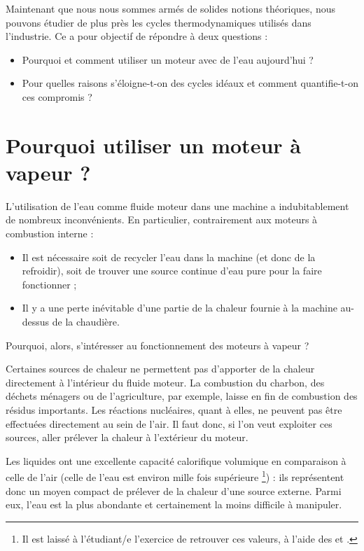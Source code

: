
	Maintenant que nous nous sommes armés de solides notions théoriques, nous pouvons étudier de plus près les cycles thermodynamiques utilisés dans l’industrie. Ce \coursneuf a pour objectif de répondre à deux questions :
	\begin{itemize}
		\item Pourquoi et comment utiliser un moteur avec de l’eau aujourd’hui ?
		\item Pour quelles raisons s’éloigne-t-on des cycles idéaux et comment quantifie-t-on ces compromis ?
	\end{itemize}\dontbreakpage \vspace{2em}


\section{Pourquoi utiliser un moteur à vapeur ?}

	L’utilisation de l’eau comme fluide moteur dans une machine a indubitablement de nombreux inconvénients. En particulier, contrairement aux moteurs à combustion interne :
	\begin{itemize}
		\item Il est nécessaire soit de recycler l’eau dans la machine (et donc de la refroidir), soit de trouver une source continue d’eau pure pour la faire fonctionner ;
		\item Il y a une perte inévitable d’une partie de la chaleur fournie à la machine au-dessus de la chaudière.
	\end{itemize}

	Pourquoi, alors, s’intéresser au fonctionnement des moteurs à vapeur ?

	Certaines sources de chaleur ne permettent pas d’apporter de la chaleur directement à l’intérieur du fluide moteur. La combustion du charbon, des déchets ménagers ou de l’agriculture, par exemple, laisse en fin de combustion des résidus importants. Les réactions nucléaires, quant à elles, ne peuvent pas être effectuées directement au sein de l’air. Il faut donc, si l’on veut exploiter ces sources, aller prélever la chaleur à l’extérieur du moteur.

	Les liquides ont une excellente capacité calorifique volumique en comparaison à celle de l’air (celle de l’eau est environ mille fois supérieure%
		\footnote{Il est laissé à l’étudiant/e l’exercice de retrouver ces valeurs, à l’aide des \coursquatre et \courscinq.}) : ils représentent donc un moyen compact de prélever de la chaleur d’une source externe. Parmi eux, l’eau est la plus abondante et certainement la moins difficile à manipuler. 

